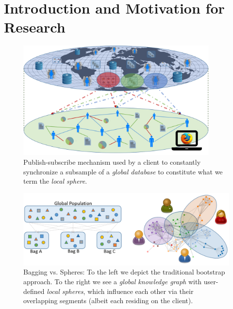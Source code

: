 \documentclass{llncs}
\begin{document}
\renewcommand{\thesubfigure}{\thefigure.\arabic{subfigure}}
\makeatletter
\renewcommand{\p@subfigure}{}
\renewcommand{\@thesubfigure}{\thesubfigure:\hskip\subfiglabelskip}
\makeatother


\section{Introduction and Motivation for Research}
\label{sect:intro_motivation}

\begin{figure}[H]
	\begin{center}
		\includegraphics[width=0.9\textwidth]{figures/local_sphere}
		\caption{Publish-subscribe mechanism used by a client to constantly synchronize a subsample of a \textit{global database} to constitute what we term the \textit{local sphere}.}
		\label{fig:local_sphere}
	\end{center}
\end{figure}


\begin{figure}[H]
	\begin{center}
		\includegraphics[width=1\textwidth]{figures/bagging_vs_local_sphere}
		\caption{Bagging vs. Spheres: To the left we depict the traditional bootstrap approach. To the right we see a \textit{global knowledge graph} with user-defined \textit{local spheres}, which influence each other via their overlapping segments (albeit each residing on the client).}
		\label{fig:bagging_vs_sphere}
	\end{center}
\end{figure}
\end{document}
